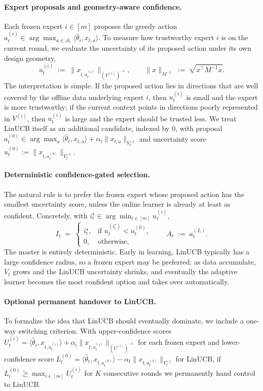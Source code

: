 \documentclass[anon]{alt2027} %
\begin{document}
\paragraph{Expert proposals and geometry-aware confidence.}
Each frozen expert $i\in[m]$ proposes the greedy action
$a_t^{(i)}\in\arg\max_{a\in\mathcal A_t}\langle\widehat\theta_i,x_{t,a}\rangle$.
To measure how trustworthy expert $i$ is on the current round, we
evaluate the uncertainty of its proposed action under its own design
geometry,
\[
u_t^{(i)} \;:=\; \bigl\|x_{t,a_t^{(i)}}\bigr\|_{(V^{(i)})^{-1}},
\qquad
\|x\|_{M^{-1}} \;:=\; \sqrt{x^\top M^{-1}x}.
\]
The interpretation is simple. If the proposed action lies in directions
that are well covered by the offline data underlying expert $i$, then
$u_t^{(i)}$ is small and the expert is more trustworthy; if the current
context points in directions poorly represented in $V^{(i)}$, then
$u_t^{(i)}$ is large and the expert should be trusted less. We treat
LinUCB itself as an additional candidate, indexed by $0$, with proposal
$a_t^{(0)}\in\arg\max_a\langle\widehat\theta_t,x_{t,a}\rangle+\alpha_t\|x_{t,a}\|_{V_t^{-1}}$
and uncertainty score $u_t^{(0)} := \|x_{t,a_t^{(0)}}\|_{V_t^{-1}}$.

\paragraph{Deterministic confidence-gated selection.}
The natural rule is to prefer the frozen expert whose proposed action
has the smallest uncertainty score, unless the online learner is
already at least as confident. Concretely, with
$i_t^\star\in\arg\min_{i\in[m]}u_t^{(i)}$,
\[
I_t \;=\;
\begin{cases}
i_t^\star, & \text{if }u_t^{(i_t^\star)}<u_t^{(0)},\\[2pt]
0, & \text{otherwise},
\end{cases}
\qquad A_t \;:=\; a_t^{(I_t)}.
\]
The master is entirely deterministic. Early in learning, LinUCB
typically has a large confidence radius, so a frozen expert may be
preferred; as data accumulate, $V_t$ grows and the LinUCB uncertainty
shrinks, and eventually the adaptive learner becomes the most confident
option and takes over automatically.

\paragraph{Optional permanent handover to LinUCB.}
To formalize the idea that LinUCB should eventually dominate, we include
a one-way switching criterion. With upper-confidence scores
$U_t^{(i)} = \langle\widehat\theta_i,x_{t,a_t^{(i)}}\rangle + \alpha_i\|x_{t,a_t^{(i)}}\|_{(V^{(i)})^{-1}}$
for each frozen expert and lower-confidence score
$L_t^{(0)} = \langle\widehat\theta_t,x_{t,a_t^{(0)}}\rangle - \alpha_t\|x_{t,a_t^{(0)}}\|_{V_t^{-1}}$
for LinUCB, if $L_t^{(0)} \ge \max_{i\in[m]} U_t^{(i)}$ for $K$
consecutive rounds we permanently hand control to LinUCB.
\end{document}
